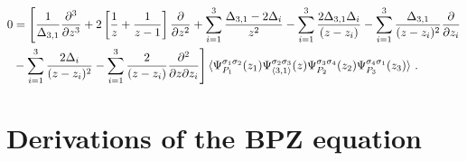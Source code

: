 \documentclass[a4paper]{article}
\begin{document}
\begin{equation}
\begin{aligned}
  0&=\Bigg[\frac{1}{\Delta_{3,1}}\frac{\partial^3}{\partial z^3}+2\left[\frac{1}{z}+\frac{1}{z-1}\right]\frac{\partial}{\partial z^2}+\sum_{i=1}^3 \frac{\Delta_{3,1}-2\Delta_i}{z^2}
  -\sum_{i=1}^3 \frac{2\Delta_{3,1}\Delta_i}{(z-z_i)}-\sum_{i=1}^3\frac{\Delta_{3,1}}{(z-z_i)^2}\frac{\partial}{\partial z_i}\\
  &-\sum_{i=1}^3 \frac{2\Delta_i}{(z-z_i)^2}-\sum_{i=1}^3 \frac{2}{(z-z_i)}\frac{\partial^2}{\partial z \partial z_i}\Bigg]\braket{\Psi_{P_1}^{\sigma_1 \sigma_2}(z_1)\Psi^{\sigma_2 \sigma_3}_{\braket{3,1}}(z)\Psi_{P_2}^{\sigma_3 \sigma_4}(z_2)\Psi_{P_3}^{\sigma_4 \sigma_1}(z_3)}\,.
\end{aligned}
\end{equation}

\appendix
\section{Derivations of the BPZ equation}
\end{document}

